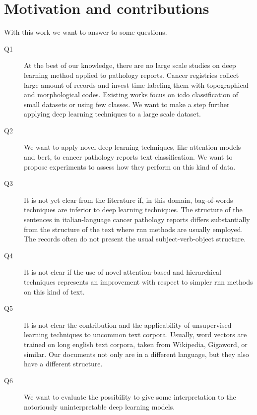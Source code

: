 \section{Motivation and contributions}\label{sec:motivation}
With this work we want to answer to some questions.
\begin{description}
\item[Q1] At the best of our
  knowledge, there are no large scale studies on deep learning method
  applied to pathology reports. Cancer registries collect large amount of
  records and invest time labeling them with topographical and
  morphological codes. Existing works focus on \ac{icdo} classification
  of small datasets or using few 
  classes. We want to make a step further applying deep learning
  techniques to a large scale dataset.
\item[Q2] We want to apply novel deep learning techniques, like
  attention models and \ac{bert}, to cancer pathology reports text
  classification. We want to propose
  experiments to assess how they perform on this kind of data.
\item[Q3] It is not yet clear from the literature if, in this domain,
  bag-of-words techniques are inferior to deep learning
  techniques. The structure of the sentences in italian-language 
  cancer pathology reports differs substantially from the structure of the text
  where \ac{rnn} methods are usually employed. The records often
  do not present the usual subject-verb-object structure.
\item[Q4] It is not clear if the use of novel attention-based and
  hierarchical techniques 
  represents an improvement with respect to simpler \ac{rnn} methods on this
  kind of text. 
\item[Q5] It is not clear the contribution and the applicability of
  unsupervised learning techniques to uncommon text corpora. Usually,
  word vectors are trained on long english text corpora, taken from
  Wikipedia, Gigaword, or similar. Our documents not only are in a
  different language, but they also have a different structure.
\item[Q6] We want to evaluate the possibility to give
  some interpretation to the notoriously uninterpretable deep learning
  models. 
\end{description}


